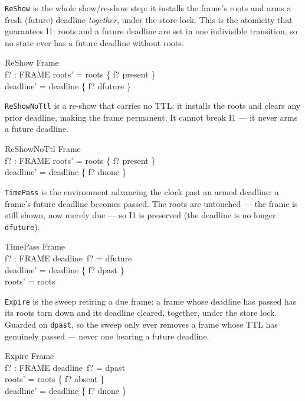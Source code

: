 \documentclass[a4paper,10pt,fleqn]{article}
\begin{document}
\texttt{ReShow} is the whole show/re-show step: it installs the frame's roots and
arms a fresh (future) deadline \emph{together}, under the store lock. This is the
atomicity that guarantees I1: roots and a future deadline are set in one
indivisible transition, so no state ever has a future deadline without roots.

\begin{schema}{ReShow}
  \Delta Frame \\
  f? : FRAME
\where
  roots' = roots \oplus \{ f? \mapsto present \} \\
  deadline' = deadline \oplus \{ f? \mapsto dfuture \}
\end{schema}

\texttt{ReShowNoTtl} is a re-show that carries no TTL: it installs the roots and
clears any prior deadline, making the frame permanent. It cannot break I1 --- it
never arms a future deadline.

\begin{schema}{ReShowNoTtl}
  \Delta Frame \\
  f? : FRAME
\where
  roots' = roots \oplus \{ f? \mapsto present \} \\
  deadline' = deadline \oplus \{ f? \mapsto dnone \}
\end{schema}

\texttt{TimePass} is the environment advancing the clock past an armed deadline:
a frame's future deadline becomes passed. The roots are untouched --- the frame is
still shown, now merely due --- so I1 is preserved (the deadline is no longer
\texttt{dfuture}).

\begin{schema}{TimePass}
  \Delta Frame \\
  f? : FRAME
\where
  deadline~f? = dfuture \\
  deadline' = deadline \oplus \{ f? \mapsto dpast \} \\
  roots' = roots
\end{schema}

\texttt{Expire} is the sweep retiring a due frame: a frame whose deadline has
passed has its roots torn down and its deadline cleared, together, under the store
lock. Guarded on \texttt{dpast}, so the sweep only ever removes a frame whose TTL
has genuinely passed --- never one bearing a future deadline.

\begin{schema}{Expire}
  \Delta Frame \\
  f? : FRAME
\where
  deadline~f? = dpast \\
  roots' = roots \oplus \{ f? \mapsto absent \} \\
  deadline' = deadline \oplus \{ f? \mapsto dnone \}
\end{schema}
\end{document}
